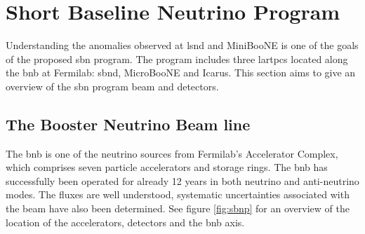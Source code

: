 \section{Short Baseline Neutrino Program}

Understanding the anomalies observed at \gls{lsnd} and MiniBooNE is one of the goals of the proposed \gls{sbn} program.
The program includes three \glspl{lartpc} located along the \gls{bnb} at Fermilab: \gls{sbnd}, MicroBooNE and Icarus.
This section aims to give an overview of the \gls{sbn} program beam and detectors.

\subsection{The Booster Neutrino Beam line}
The \gls{bnb} is one of the neutrino sources from Fermilab's Accelerator Complex, which comprises seven particle accelerators and storage rings.
The \gls{bnb} has successfully been operated for already 12 years in both neutrino and anti-neutrino modes.
The fluxes are well understood, systematic uncertainties associated with the beam have also been determined\cite[-.5em]{Antonello:2015lea}.
See figure \ref{fig:sbnp} for an overview of the location of the accelerators, detectors and the \gls{bnb} axis.
